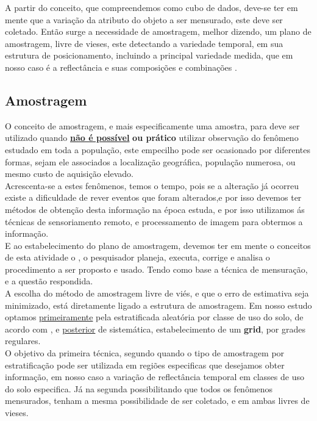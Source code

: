   \hspace*{1.25 cm} A partir do conceito, que compreendemos como cubo de dados, deve-se ter em mente que a variação da atributo do objeto a ser mensurado, este deve ser coletado. Então  surge a necessidade de amostragem, melhor dizendo, um plano de amostragem, livre de vieses, este detectando a variedade temporal, em sua estrutura de posicionamento, incluindo a principal variedade medida, que em nosso caso é a reflectância e suas composições e combinações .
%
 \subsection{Amostragem}
%
  \hspace*{1.25 cm} O conceito de amostragem, e mais especificamente uma amostra, para  \cite[p.~281]{Krishnaswamy} deve ser utilizado quando \textbf{\underline{não é possível}} \textbf{ou prático} utilizar observação do fenômeno estudado em toda a população, este empecilho pode ser ocasionado por diferentes formas, sejam ele associados a localização geográfica, população numerosa, ou mesmo custo de aquisição elevado.\\
  \hspace*{1.25 cm}  Acrescenta-se a estes fenômenos, temos o tempo, pois se a alteração já ocorreu existe a dificuldade de rever eventos que foram alterados,e por isso devemos ter métodos de obtenção desta informação na época estuda, e por isso utilizamos ás técnicas de sensoriamento remoto, e processamento de imagem  para obtermos a informação.\\
  \hspace*{1.25 cm} E ao estabelecimento do plano de amostragem, devemos ter em mente o conceitos de esta atividade o  \cite[p.2]{Bolfarine1},  o pesquisador planeja, executa, corrige e analisa o procedimento a ser proposto e usado. Tendo como base a técnica de mensuração, e a questão respondida.\\
% 
  \hspace*{1.25 cm} A escolha do método de amostragem livre de viés, e que o erro de estimativa seja minimizado, está diretamente ligado a estrutura de amostragem.  Em nosso estudo optamos \underline{primeiramente} pela estratificada aleatória por classe de uso do solo, de acordo com \cite[p.191]{Ariza}, e  \underline{posterior}  de  sistemática, estabelecimento de um \textbf{grid}, por grades regulares.\\
  \hspace*{1.25 cm}  O objetivo da primeira técnica, segundo  \cite[p.22]{Lohr} quando o tipo de amostragem por estratificação pode ser utilizada em regiões especificas que desejamos obter informação, em nosso caso a variação de reflectância temporal em classes de uso do solo especifica. Já na segunda  possibilitando que todos os fenômenos mensurados, tenham a mesma possibilidade de ser coletado, e em ambas livres de vieses.\\
